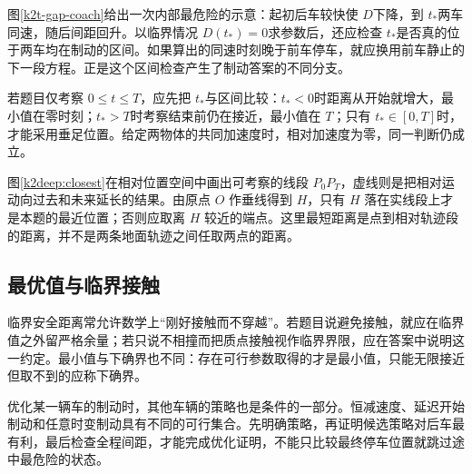 图\ref{k2t-gap-coach}给出一次内部最危险的示意：起初后车较快使 $D$下降，到 $t_*$两车同速，随后间距回升。以临界情况 $D(t_*)=0$求参数后，还应检查 $t_*$是否真的位于两车均在制动的区间。如果算出的同速时刻晚于前车停车，就应换用前车静止的下一段方程。正是这个区间检查产生了制动答案的不同分支。

若题目仅考察 $0\le t\le T$，应先把 $t_*$与区间比较：$t_*<0$时距离从开始就增大，最小值在零时刻；$t_*>T$时考察结束前仍在接近，最小值在 $T$；只有 $t_*\in[0,T]$时，才能采用垂足位置。给定两物体的共同加速度时，相对加速度为零，同一判断仍成立。




图\ref{k2deep:closest}在相对位置空间中画出可考察的线段 $P_0P_T$，虚线则是把相对运动向过去和未来延长的结果。由原点 $O$ 作垂线得到 $H$，只有 $H$ 落在实线段上才是本题的最近位置；否则应取离 $H$ 较近的端点。这里最短距离是点到相对轨迹段的距离，并不是两条地面轨迹之间任取两点的距离。


\subsection{最优值与临界接触}
临界安全距离常允许数学上“刚好接触而不穿越”。若题目说避免接触，就应在临界值之外留严格余量；若只说不相撞而把质点接触视作临界界限，应在答案中说明这一约定。最小值与下确界也不同：存在可行参数取得的才是最小值，只能无限接近但取不到的应称下确界。

优化某一辆车的制动时，其他车辆的策略也是条件的一部分。恒减速度、延迟开始制动和任意时变制动具有不同的可行集合。先明确策略，再证明候选策略对后车最有利，最后检查全程间距，才能完成优化证明，不能只比较最终停车位置就跳过途中最危险的状态。


